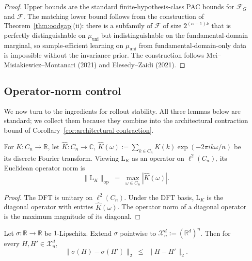 \begin{proof}
Upper bounds are the standard finite-hypothesis-class PAC bounds for
$\mathcal{F}_G$ and $\mathcal{F}$.  The matching lower bound follows
from the construction of Theorem~\ref{thm:oodgap}(ii): there is a
subfamily of $\mathcal{F}$ of size $2^{(n-1)k}$ that is perfectly
distinguishable on $\mu_\mathrm{uni}$ but indistinguishable on the
fundamental-domain marginal, so sample-efficient learning on
$\mu_\mathrm{uni}$ from fundamental-domain-only data is impossible
without the invariance prior.  The construction follows
Mei--Misiakiewicz--Montanari (2021) and Elesedy--Zaidi (2021).
\end{proof}

\subsection{Operator-norm control}

We now turn to the ingredients for rollout stability.  All three
lemmas below are standard; we collect them because they combine into
the architectural contraction bound of
Corollary~\ref{cor:architectural-contraction}.

\begin{lemma}
\label{lem:fft-norm}
For $K : C_n \to \mathbb{R}$, let $\hat{K} : C_n \to \mathbb{C}$,
$\hat{K}(\omega) := \sum_{k \in C_n} K(k) \exp(-2\pi i k \omega / n)$ be
its discrete Fourier transform.  Viewing $\mathrm{L}_K$ as an operator on
$\ell^2(C_n)$, its Euclidean operator norm is
\[
  \|\mathrm{L}_K\|_\mathrm{op}
  \;=\; \max_{\omega \in C_n} |\hat{K}(\omega)|.
\]
\end{lemma}

\begin{proof}
The DFT is unitary on $\ell^2(C_n)$.  Under the DFT basis, $\mathrm{L}_K$ is
the diagonal operator with entries $\hat{K}(\omega)$.  The operator
norm of a diagonal operator is the maximum magnitude of its diagonal.
\end{proof}

\begin{lemma}
\label{lem:pointwise-norm}
Let $\sigma : \mathbb{R} \to \mathbb{R}$ be $1$-Lipschitz.  Extend
$\sigma$ pointwise to $\mathcal{X}_n^d := (\mathbb{R}^d)^n$.  Then for every
$H, H' \in \mathcal{X}_n^d$,
\[
  \|\sigma(H) - \sigma(H')\|_2 \;\le\; \|H - H'\|_2.
\]
\end{lemma}

